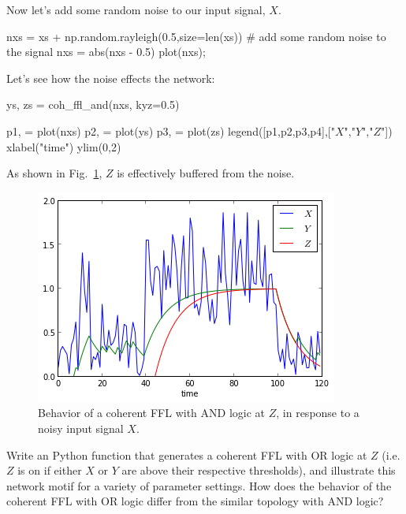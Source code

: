 Now let's add some random noise to our input signal, $X$.
%
\begin{python}
nxs = xs + np.random.rayleigh(0.5,size=len(xs)) # add some random noise to the signal
nxs = abs(nxs - 0.5)
plot(nxs);
\end{python}
%
Let's see how the noise effects the network:
%
\begin{python}
ys, zs = coh_ffl_and(nxs, kyz=0.5)

p1, = plot(nxs)
p2, = plot(ys)
p3, = plot(zs)
legend([p1,p2,p3,p4],["$X$","$Y$","$Z$"])
xlabel("time")
ylim(0,2)
\end{python}
%
As shown in Fig.~\ref{fig:noisyffl}, $Z$ is effectively buffered from the noise.
%
\begin{figure}[!ht]
    \centering
    \includegraphics[width=0.33\columnwidth]{./figures/hands-on12/fig-noisyffl.png}
    \caption{Behavior of a coherent FFL with AND logic at $Z$, in response to a noisy input signal $X$.}\label{fig:noisyffl}
\end{figure}

\medskip
\begin{assignment}
Write an Python function that generates a coherent FFL with OR logic at $Z$ (i.e. $Z$ is on if either $X$ or $Y$ are above their respective thresholds), and illustrate this network motif for a variety of parameter settings.  How does the behavior of the coherent FFL with OR logic differ from the similar topology with AND logic?
\end{assignment}
